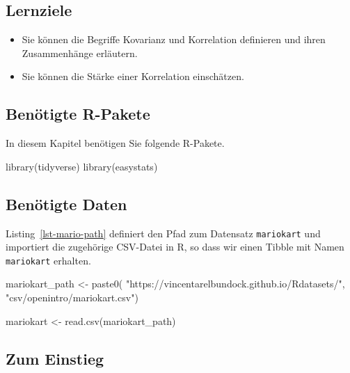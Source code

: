 \documentclass[
  letterpaper,
]{scrbook}
\newenvironment{Shaded}{\begin{snugshade}}{\end{snugshade}}
\newcommand{\FunctionTok}[1]{\textcolor[rgb]{0.28,0.35,0.67}{#1}}
\newcommand{\NormalTok}[1]{\textcolor[rgb]{0.00,0.23,0.31}{#1}}
\newcommand{\OtherTok}[1]{\textcolor[rgb]{0.00,0.23,0.31}{#1}}
\newcommand{\StringTok}[1]{\textcolor[rgb]{0.13,0.47,0.30}{#1}}
\providecommand{\tightlist}{%
  \setlength{\itemsep}{0pt}\setlength{\parskip}{0pt}}\usepackage{longtable,booktabs,array}
\theoremstyle{definition}
\theoremstyle{definition}
\theoremstyle{definition}
\theoremstyle{remark}
\begin{document}
\subsection{Lernziele}\label{lernziele-7}

\begin{itemize}
\tightlist
\item
  Sie können die Begriffe Kovarianz und Korrelation definieren und ihren
  Zusammenhänge erläutern.
\item
  Sie können die Stärke einer Korrelation einschätzen.
\end{itemize}

\subsection{Benötigte R-Pakete}\label{benuxf6tigte-r-pakete-4}

In diesem Kapitel benötigen Sie folgende R-Pakete.

\begin{Shaded}
\begin{Highlighting}[]
\FunctionTok{library}\NormalTok{(tidyverse)}
\FunctionTok{library}\NormalTok{(easystats)}
\end{Highlighting}
\end{Shaded}

\subsection{Benötigte Daten}\label{benuxf6tigte-daten-5}

Listing~\ref{lst-mario-path} definiert den Pfad zum Datensatz
\texttt{mariokart} und importiert die zugehörige CSV-Datei in R, so dass
wir einen Tibble mit Namen \texttt{mariokart} erhalten.

\begin{Shaded}
\begin{Highlighting}[]
\NormalTok{mariokart\_path }\OtherTok{\textless{}{-}} \FunctionTok{paste0}\NormalTok{(}
  \StringTok{"https://vincentarelbundock.github.io/Rdatasets/"}\NormalTok{,}
  \StringTok{"csv/openintro/mariokart.csv"}\NormalTok{)}

\NormalTok{mariokart }\OtherTok{\textless{}{-}} \FunctionTok{read.csv}\NormalTok{(mariokart\_path)}
\end{Highlighting}
\end{Shaded}

\subsection{Zum Einstieg}\label{zum-einstieg-2}
\end{document}
